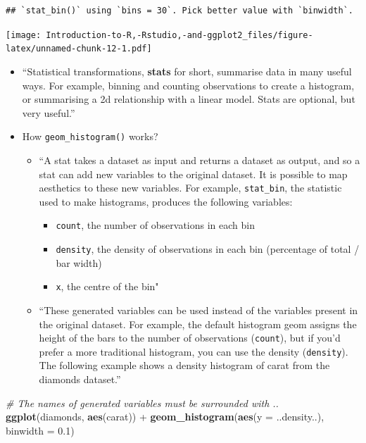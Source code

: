 \documentclass[]{book}
\newenvironment{Shaded}{\begin{snugshade}}{\end{snugshade}}
\newcommand{\KeywordTok}[1]{\textcolor[rgb]{0.13,0.29,0.53}{\textbf{{#1}}}}
\newcommand{\DataTypeTok}[1]{\textcolor[rgb]{0.13,0.29,0.53}{{#1}}}
\newcommand{\FloatTok}[1]{\textcolor[rgb]{0.00,0.00,0.81}{{#1}}}
\newcommand{\StringTok}[1]{\textcolor[rgb]{0.31,0.60,0.02}{{#1}}}
\newcommand{\CommentTok}[1]{\textcolor[rgb]{0.56,0.35,0.01}{\textit{{#1}}}}
\newcommand{\NormalTok}[1]{{#1}}
\providecommand{\tightlist}{%
  \setlength{\itemsep}{0pt}\setlength{\parskip}{0pt}}
\begin{document}
\begin{verbatim}
## `stat_bin()` using `bins = 30`. Pick better value with `binwidth`.
\end{verbatim}

\texttt{[image: Introduction-to-R,-Rstudio,-and-ggplot2\_files/figure-latex/unnamed-chunk-12-1.pdf]}

\begin{itemize}
\item
  ``Statistical transformations, \textbf{stats} for short, summarise
  data in many useful ways. For example, binning and counting
  observations to create a histogram, or summarising a 2d relationship
  with a linear model. Stats are optional, but very useful.''
  \citep{ggplot2}
\item
  How \texttt{geom\_histogram()} works?

  \begin{itemize}
  \tightlist
  \item
    ``A stat takes a dataset as input and returns a dataset as output,
    and so a stat can add new variables to the original dataset. It is
    possible to map aesthetics to these new variables. For example,
    \texttt{stat\_bin}, the statistic used to make histograms, produces
    the following variables:

    \begin{itemize}
    \tightlist
    \item
      \texttt{count}, the number of observations in each bin
    \item
      \texttt{density}, the density of observations in each bin
      (percentage of total / bar width)
    \item
      \texttt{x}, the centre of the bin" \citep{ggplot2}
    \end{itemize}
  \item
    ``These generated variables can be used instead of the variables
    present in the original dataset. For example, the default histogram
    geom assigns the height of the bars to the number of observations
    (\texttt{count}), but if you'd prefer a more traditional histogram,
    you can use the density (\texttt{density}). The following example
    shows a density histogram of carat from the diamonds dataset.''
    \citep{ggplot2}
  \end{itemize}
\end{itemize}

\begin{Shaded}
\begin{Highlighting}[]
\CommentTok{# The names of generated variables must be surrounded with ..}
 \KeywordTok{ggplot}\NormalTok{(diamonds, }\KeywordTok{aes}\NormalTok{(carat)) +}\StringTok{ }\KeywordTok{geom_histogram}\NormalTok{(}\KeywordTok{aes}\NormalTok{(}\DataTypeTok{y =} \NormalTok{..density..), }\DataTypeTok{binwidth =} \FloatTok{0.1}\NormalTok{)}
\end{Highlighting}
\end{Shaded}
\end{document}
